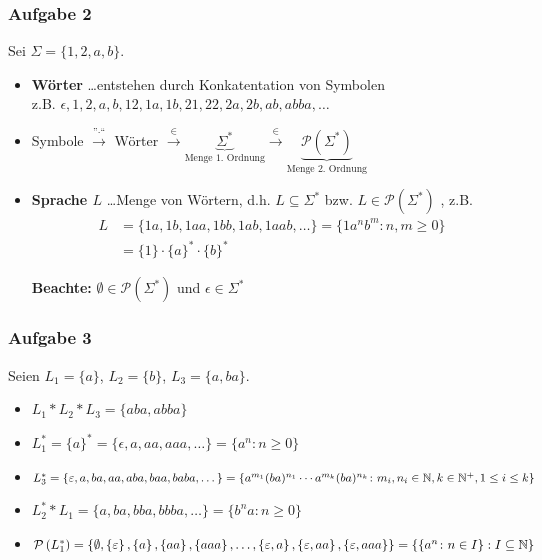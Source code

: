\documentclass{beamer}
\begin{document}
\begin{frame} \frametitle{Aufgabe 2}
	Sei $\Sigma = \{1,2,a,b\}$. \pause
	\begin{itemize}[leftmargin=*]
		\item \textbf{Wörter}
		\dots entstehen durch Konkatentation von Symbolen \\
		z.B. $\epsilon, 1, 2, a,b,12,1a,1b,21,22,2a,2b,ab,abba,\dots$
		\pause
		\item Symbole $\overset{\text{''}\cdot\text{``}}{\longrightarrow}$ Wörter $\overset{\in}{\longrightarrow} \underbrace{\Sigma^\ast}_{\text{Menge 1. Ordnung}} \overset{\in}{\longrightarrow} \underbrace{\mathcal{P}(\Sigma^\ast)}_{\text{Menge 2. Ordnung}}$
		\pause
		\item \textbf{Sprache $L$}
		\dots Menge von Wörtern, d.h. $L \subseteq \Sigma^\ast$ bzw. $L \in \mathcal{P}(\Sigma^\ast)$ , z.B.
		\begin{equation*}
		\begin{aligned}
		L &= \{1a,1b,1aa,1bb,1ab,1aab, \dots \} 
		= \{1 a^n b^m \colon n,m \ge 0 \} \\
		&= \{1\} \cdot \{a\}^\ast \cdot \{b\}^\ast
		\end{aligned}
		\end{equation*}
		
		\textbf{Beachte:} $\emptyset \in \mathcal{P}(\Sigma^\ast)$ und $\epsilon \in \Sigma^\ast$
	\end{itemize}
	
\end{frame}

\begin{frame} \frametitle{Aufgabe 3}
	Seien $L_1 = \{a\}$, $L_2 = \{b\}$, $L_3 = \{a,ba\}$.
	
	\begin{itemize}[leftmargin=*]
		\item $L_1 * L_2 * L_3 = \{aba,abba\}$
		\item $L_1^\ast = \{a\}^\ast = \{\epsilon,a,aa,aaa, \dots\} = \{a^n \colon n \ge 0\}$
	 	\item $L_3^\ast = \{\varepsilon, a,ba,aa,aba,baa,baba,\dots\} = \{a^{m_1}(ba)^{n_1} \cdots a^{m_k}(ba)^{n_k} \colon m_i, n_i \in \mathbb{N}, k \in \mathbb{N}^+, 1 \le i \le k\}$
	 	\item $L_2^\ast * L_1 = \{a,ba,bba,bbba,\dots\} = \{b^n a \colon n \ge 0\}$
	 	\item $\mathcal{P}\left( L_1^\ast \right) = \left\{ \emptyset, \left\{ \varepsilon \right\}, \left\{ a \right\}, \left\{ aa \right\}, \left\{ aaa \right\}, \dots , \left\{ \varepsilon, a \right\}, \left\{ \varepsilon,aa \right\}, \left\{ \varepsilon,aaa \right\} \right\} = \left\{ \left\{ a^n \colon n \in I \right\} : I \subseteq \mathbb{N} \right\}$
	\end{itemize}
\end{frame}
\end{document}
